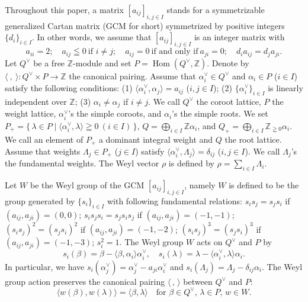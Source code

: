 \documentclass[12pt,twoside]{article}
\newcommand\bra{\langle}
\newcommand\ket{\rangle}
\newcommand\Hom{\mathop{\mathrm{Hom}}\nolimits}
\newcommand\av{\alpha^\vee}
\newcommand\Qv{Q^\vee}
\newcommand\Z{{\mathbb Z}} %
\theoremstyle{plain} %
\theoremstyle{definition} %
\theoremstyle{definition} %
\numberwithin{theorem}{section}
\numberwithin{equation}{section}
\numberwithin{figure}{section}
\numberwithin{table}{section}
\begin{document}
Throughout this paper, 
a matrix $[a_{ij}]_{i,j\in I}$ stands for 
a symmetrizable generalized Cartan matrix 
(GCM for short) symmetrized by positive integers $\{d_i\}_{i\in I}$.
In other words, we assume that $[a_{ij}]_{i,j\in I}$ is an integer matrix with
\begin{equation*}
 a_{ii}=2; \quad
 a_{ij}\leqq 0\ \text{if $i\ne j$}; \quad
 a_{ij}=0\ \text{if and only if}\ a_{ji}=0; \quad
 d_ia_{ij} = d_ja_{ji}.
\end{equation*}
Let $\Qv$ be a free $\Z$-module and set $P=\Hom(\Qv,\Z)$.
Denote by $\bra\ ,\ \ket:\Qv\times P\to\Z$ the canonical pairing.
Assume that $\av_i\in \Qv$ and $\alpha_i\in P$ ($i\in I$) 
satisfy the following conditions:
(1) $\bra\av_i,\alpha_j\ket=a_{ij}$ ($i,j\in I$);
(2) $\{\av_i\}_{i\in I}$ is linearly independent over $\Z$;
(3) $\alpha_i\ne\alpha_j$ if $i\ne j$.
We call $\Qv$ the coroot lattice, $P$ the weight lattice, 
$\av_i$'s the simple coroots, and $\alpha_i$'s the simple roots.
We set $P_+=\{\,\lambda\in P\mid\bra\av_i,\lambda\ket\geqq 0\ (i\in I)\,\}$,
$Q=\bigoplus_{i\in I}\Z\alpha_i$, and
$Q_+=\bigoplus_{i\in I}\Z_{\geqq 0}\alpha_i$.
We call an element of $P_+$ a dominant integral weight
and $Q$ the root lattice.
Assume that weights $\Lambda_j\in P_+$ ($j\in I$) satisfy
$\bra\av_i,\Lambda_j\ket=\delta_{ij}$ ($i,j\in I$).
We call $\Lambda_j$'s the fundamental weights.
The Weyl vector $\rho$ is defined by $\rho=\sum_{i\in I}\Lambda_i$.

Let $W$ be the Weyl group of the GCM $[a_{ij}]_{i,j\in I}$,
namely $W$ is defined to be the group generated by $\{s_i\}_{i\in I}$
with following fundamental relations:
$s_is_j=s_js_i$         if $(a_{ij},a_{ji})=(0,0)$;
$s_is_js_i=s_js_is_j$   if $(a_{ij},a_{ji})=(-1,-1)$;
$(s_is_j)^2=(s_js_i)^2$ if $(a_{ij},a_{ji})=(-1,-2)$;
$(s_is_j)^3=(s_js_i)^3$ if $(a_{ij},a_{ji})=(-1,-3)$;
$s_i^2=1$.
The Weyl group $W$ acts on $\Qv$ and $P$ by
\begin{equation*}
 s_i(\beta)=\beta-\bra\beta,\alpha_i\ket\av_i, \quad
 s_i(\lambda)=\lambda-\bra\av_i,\lambda\ket\alpha_i.
\end{equation*}
In particular, we have
$s_i(\av_j)=\av_j-a_{ji}\av_i$ and
$s_i(\Lambda_j)=\Lambda_j-\delta_{ij}\alpha_i$.
The Weyl group action preserves 
the canonical pairing $\bra\,,\,\ket$ between $\Qv$ and $P$:
\begin{equation*}
 \bra w(\beta),w(\lambda)\ket 
 = \bra\beta,\lambda\ket
 \quad
 \text{for $\beta\in\Qv$, $\lambda\in P$, $w\in W$}.
\end{equation*}
\end{document}
